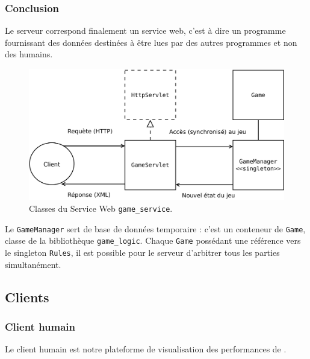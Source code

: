 \subsubsection{Conclusion}
Le serveur correspond finalement un service web, c'est à dire un programme fournissant des données destinées à être lues par des autres programmes et non des humains.
\begin{figure}[H] 
\centering
\includegraphics[width=\textwidth]{files/env/game_service} 
\caption{Classes du Service Web \texttt{game\_service}.} 
\label{game_service}
\end{figure}
Le \texttt{GameManager} sert de base de données temporaire : c'est un conteneur de \texttt{Game}, classe de la bibliothèque \texttt{game\_logic}. Chaque \texttt{Game} possédant une référence vers le singleton \texttt{Rules}, il est possible pour le serveur d'arbitrer tous les parties simultanément.

\subsection{Clients}

\subsubsection{Client humain}
Le client humain est notre plateforme de visualisation des performances de \cogito{}.


